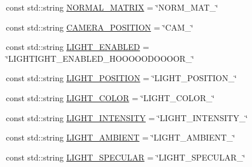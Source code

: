 \begin{DoxyCompactItemize}
\item 
const std\-::string \hyperlink{namespaceburn_a4daeaa4edb8bd22d9f48786640972b3a}{N\-O\-R\-M\-A\-L\-\_\-\-M\-A\-T\-R\-I\-X} = \char`\"{}N\-O\-R\-M\-\_\-\-M\-A\-T\-\_\-\char`\"{}
\item 
const std\-::string \hyperlink{namespaceburn_aea213969ba83f20b14023eac83ce7f04}{C\-A\-M\-E\-R\-A\-\_\-\-P\-O\-S\-I\-T\-I\-O\-N} = \char`\"{}C\-A\-M\-\_\-\char`\"{}
\item 
const std\-::string \hyperlink{namespaceburn_a2761e037b3be5b8f6f125f294a44b0bf}{L\-I\-G\-H\-T\-\_\-\-E\-N\-A\-B\-L\-E\-D} = \char`\"{}L\-I\-G\-H\-T\-I\-G\-H\-T\-\_\-\-E\-N\-A\-B\-L\-E\-D\-\_\-\-H\-O\-O\-O\-O\-O\-D\-O\-O\-O\-O\-R\-\_\-\char`\"{}
\item 
const std\-::string \hyperlink{namespaceburn_a6512046548178a3d2212bfbca815c5b0}{L\-I\-G\-H\-T\-\_\-\-P\-O\-S\-I\-T\-I\-O\-N} = \char`\"{}L\-I\-G\-H\-T\-\_\-\-P\-O\-S\-I\-T\-I\-O\-N\-\_\-\char`\"{}
\item 
const std\-::string \hyperlink{namespaceburn_ad5901e3871a98659781464fbbcd2e37c}{L\-I\-G\-H\-T\-\_\-\-C\-O\-L\-O\-R} = \char`\"{}L\-I\-G\-H\-T\-\_\-\-C\-O\-L\-O\-R\-\_\-\char`\"{}
\item 
const std\-::string \hyperlink{namespaceburn_aca7df8a95e5540d26da673ad43c639af}{L\-I\-G\-H\-T\-\_\-\-I\-N\-T\-E\-N\-S\-I\-T\-Y} = \char`\"{}L\-I\-G\-H\-T\-\_\-\-I\-N\-T\-E\-N\-S\-I\-T\-Y\-\_\-\char`\"{}
\item 
const std\-::string \hyperlink{namespaceburn_a1f547dd93c8820ec1276db0869c7e92c}{L\-I\-G\-H\-T\-\_\-\-A\-M\-B\-I\-E\-N\-T} = \char`\"{}L\-I\-G\-H\-T\-\_\-\-A\-M\-B\-I\-E\-N\-T\-\_\-\char`\"{}
\item 
const std\-::string \hyperlink{namespaceburn_a4a1c8f51e081e667c4a08ab9251a8b61}{L\-I\-G\-H\-T\-\_\-\-S\-P\-E\-C\-U\-L\-A\-R} = \char`\"{}L\-I\-G\-H\-T\-\_\-\-S\-P\-E\-C\-U\-L\-A\-R\-\_\-\char`\"{}
\end{DoxyCompactItemize}


